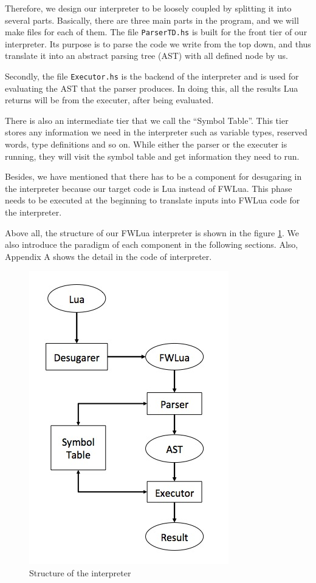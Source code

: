 Therefore, we design our interpreter to be loosely coupled by splitting it into several parts. Basically, there are three main parts in the program, and we will make files for each of them. The file {\tt ParserTD.hs} is built for the front tier of our interpreter. Its purpose is to parse the code we write from the top down, and thus translate it into an
abstract parsing tree (AST) with all defined node by us. 

Secondly, the file {\tt Executor.hs} is the backend of the interpreter and is used for evaluating the AST that the parser produces. In doing this, all the results Lua returns will be from the executer, after being evaluated. 

There is also an intermediate tier that we call the ``Symbol Table''. This tier stores any information we need in the interpreter such as variable types, reserved words, type definitions and so on. While either the parser or the executer is running, they will visit the symbol table and get information they need to run. 

Besides, we have mentioned that there has to be a component for desugaring in the interpreter because our target code is Lua instead of FWLua. This phase needs to be executed at the beginning to translate inputs into FWLua code for the interpreter. 

Above all, the structure of our FWLua interpreter is shown in the figure \ref {fig:structure}. We also introduce the paradigm of each component in the following sections. Also,
Appendix A shows the detail in the code of interpreter.
\begin{figure}
\centering
\caption{Structure of the interpreter}
\label{fig:structure}
\includegraphics[scale = 0.9]{Interpreter}
\end{figure}

